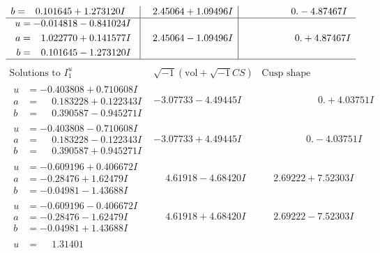 \documentclass[1p]{elsarticle_modified}
\theoremstyle{definition}
\newcommand{\I}{\sqrt{-1}}
\begin{document}
$$\begin{array}{c|c|c}
\begin{aligned}
b &= \phantom{-}0.101645 + 1.273120 I\end{aligned}
 & \phantom{-}2.45064 + 1.09496 I & \phantom{-0.000000 } 0. - 4.87467 I \\ \hline\begin{aligned}
u &= -0.014818 - 0.841024 I \\
a &= \phantom{-}1.022770 + 0.141577 I \\
b &= \phantom{-}0.101645 - 1.273120 I\end{aligned}
 & \phantom{-}2.45064 - 1.09496 I & \phantom{-0.000000 -}0. + 4.87467 I\\
 \hline 
 \end{array}$$\newpage$$\begin{array}{c|c|c}  
\text{Solutions to }I^u_{1}& \I (\text{vol} + \sqrt{-1}CS) & \text{Cusp shape}\\
 \hline 
\begin{aligned}
u &= -0.403808 + 0.710608 I \\
a &= \phantom{-}0.183228 + 0.122343 I \\
b &= \phantom{-}0.390587 - 0.945271 I\end{aligned}
 & -3.07733 - 4.49445 I & \phantom{-0.000000 -}0. + 4.03751 I \\ \hline\begin{aligned}
u &= -0.403808 - 0.710608 I \\
a &= \phantom{-}0.183228 - 0.122343 I \\
b &= \phantom{-}0.390587 + 0.945271 I\end{aligned}
 & -3.07733 + 4.49445 I & \phantom{-0.000000 } 0. - 4.03751 I \\ \hline\begin{aligned}
u &= -0.609196 + 0.406672 I \\
a &= -0.28476 + 1.62479 I \\
b &= -0.04981 - 1.43688 I\end{aligned}
 & \phantom{-}4.61918 - 4.68420 I & \phantom{-}2.69222 + 7.52303 I \\ \hline\begin{aligned}
u &= -0.609196 - 0.406672 I \\
a &= -0.28476 - 1.62479 I \\
b &= -0.04981 + 1.43688 I\end{aligned}
 & \phantom{-}4.61918 + 4.68420 I & \phantom{-}2.69222 - 7.52303 I \\ \hline\begin{aligned}
u &= \phantom{-}1.31401\phantom{ +0.000000I} \\

\end{aligned}
\end{array}$$
\end{document}
